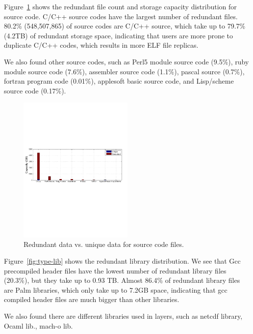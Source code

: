 Figure~\ref{fig:type-source} shows the redundant file count and storage capacity distribution for source code. C/C++ source codes have the largest number of redundant files. 80.2\% (548,507,865) of source codes are C/C++ source, which take up to 79.7\% (4.2TB) of redundant storage space, indicating that users are more prone to duplicate C/C++ codes, which results in more ELF file replicas.

We also found other source codes, such as Perl5 module source code (9.5\%), ruby module source code (7.6\%), assembler source code (1.1\%), pascal source (0.7\%), fortran program code (0.01\%), applesoft basic source code, and Lisp/scheme source code (0.17\%).

\begin{figure}
	\centering
	\includegraphics[width=0.5\textwidth]{graphs/type-lang-cap}
	\caption{Redundant data vs. unique data for source code files.
	}
	\label{fig:type-source}
\end{figure}

Figure~\ref{fig:type-lib} shows the redundant library distribution. We see that Gcc precompiled header files have the lowest number of redundant library files (20.3\%), but they take up to 0.93 TB. Almost 86.4\% of redundant library files are Palm libraries, which only take up to 7.2GB space, indicating that gcc compiled header files are much bigger than other libraries.

We also found there are different libraries used in layers, such as netcdf library, Ocaml lib., mach-o lib.

%

